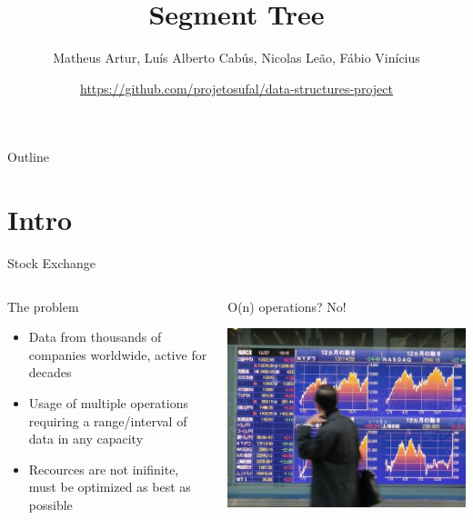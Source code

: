 \documentclass[presentation,12pt]{beamer}
\author{Matheus Artur, Luís Alberto Cabús, Nicolas Leão, Fábio Vinícius}
\date{\url{https://github.com/projetosufal/data-structures-project}}
\title{Segment Tree}
\begin{document}
\maketitle
\begin{frame}{Outline}
\tableofcontents
\end{frame}


\section{Intro}
\label{sec:org2504831}

\begin{frame}[label={sec:org40c6638}]{Stock Exchange}
\begin{columns}
\begin{column}{0.48\columnwidth}
\begin{block}{The problem}
\begin{itemize}
\item Data from thousands of companies worldwide, active for decades
\item Usage of multiple operations requiring a range/interval of data in any capacity
\item Recources are not inifinite, must be optimized as best as possible
\end{itemize}
\end{block}
\end{column}


\begin{column}{0.48\columnwidth}
\begin{block}{O(n) operations? No!}
\begin{center}
\includegraphics[width=.9\linewidth]{./img/serv.png}
\end{center}
\end{block}
\end{column}
\end{columns}
\end{frame}
\end{document}
